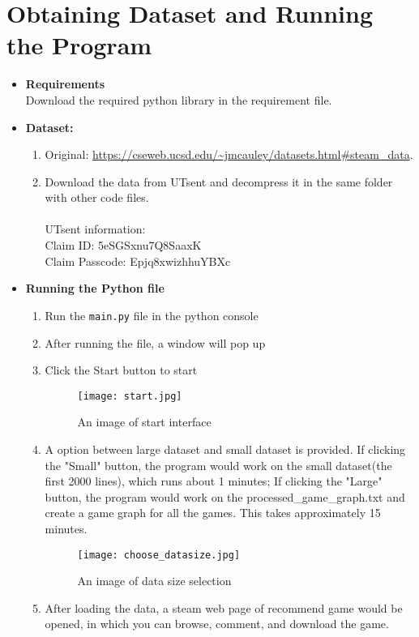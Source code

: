 \documentclass{article}
\begin{document}
\section{Obtaining Dataset and Running the Program}
\begin{itemize}
    \item \textbf{Requirements}\\
    Download the required python library in the requirement file.
    \item \textbf{Dataset:}
    \begin{enumerate}
        \item Original: \url{https://cseweb.ucsd.edu/~jmcauley/datasets.html#steam_data}.\\
        \item Download the data from UTsent and decompress it in the same folder with other code files.\\\\
        UTsent information:\\
        Claim ID: 5eSGSxnu7Q8SaaxK\\
        Claim Passcode: Epjq8xwizhhuYBXc
    \end{enumerate}
    \item \textbf{Running the Python file}
    \begin{enumerate}
        \item Run the \texttt{main.py} file in the python console
        \item After running the file, a window will pop up
        \item Click the Start button to start 
        \begin{figure}[htp]
            \centering
            \texttt{[image: start.jpg]}
            \caption{An image of start interface}
        \end{figure}
        \item A option between large dataset and small dataset is provided. If clicking the "Small" button, the program would work on the small dataset(the first 2000 lines), which runs about 1 minutes; If clicking the "Large" button, the program would work on the processed\_game\_graph.txt and create a game graph for all the games. This takes approximately 15 minutes.
        \begin{figure}[htp]
            \centering
            \texttt{[image: choose\_datasize.jpg]}
            \caption{An image of data size selection}
        \end{figure}
        \item After loading the data, a steam web page of recommend game would be opened, in which you can browse, comment, and download the game.

\end{enumerate}
\end{itemize}
\end{document}
